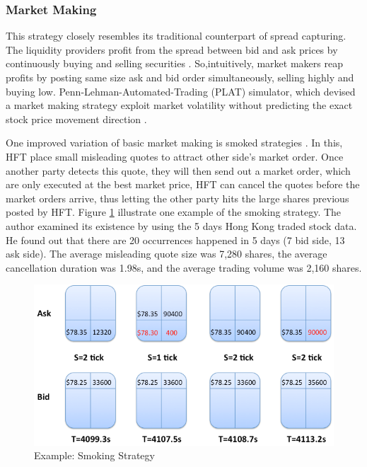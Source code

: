 \documentclass[12pt,a4paper]{article}
\numberwithin{equation}{section}
\numberwithin{figure}{section}
\numberwithin{table}{section}
\begin{document}
\subsubsection{Market Making}
This strategy closely resembles its traditional counterpart of spread capturing. The liquidity providers profit from the spread between bid and ask prices by continuously buying and selling securities \citep{gomer2011}. So,intuitively, market makers reap profits by posting same size ask and bid order simultaneously, selling highly and buying low. Penn-Lehman-Automated-Trading (PLAT) simulator, which devised a market making strategy exploit market volatility without predicting the exact stock price movement direction \citep{lu2012}.

One improved variation of basic market making is smoked strategies \citep{lu2012}. In this, HFT place small misleading quotes to attract other side's market order. Once another party detects this quote, they will then send out a market order, which are only executed at the best market price, HFT can cancel the quotes before the 
market orders arrive, thus letting the other party hits the large shares previous posted by 
HFT. Figure \ref{fig:SS} illustrate one example of the smoking strategy. The author examined its existence by using the 5 days Hong Kong traded stock data. He found out that there are 20 occurrences happened in 5 days (7 bid side, 13 ask side). The average misleading quote size was 7,280 shares, the average cancellation duration was 1.98s, and the average trading volume was 2,160 shares. 

\begin{figure}[ht]
\begin{center}
\includegraphics[width=\textwidth]{SS}
\caption{Example: Smoking Strategy \citep{lu2012}}
\label{fig:SS}
\end{center}
\end{figure}
\end{document}
